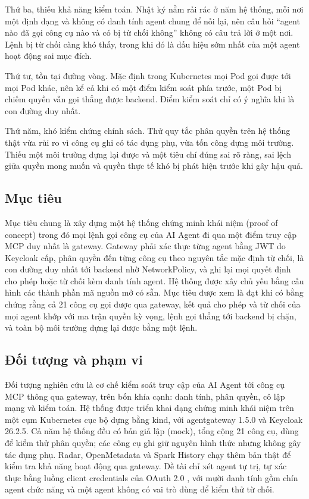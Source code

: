 Thứ ba, thiếu khả năng kiểm toán. Nhật ký nằm rải rác ở năm hệ thống, mỗi nơi một định dạng và không có danh tính agent chung để nối lại, nên câu hỏi ``agent nào đã gọi công cụ nào và có bị từ chối không'' không có câu trả lời ở một nơi. Lệnh bị từ chối càng khó thấy, trong khi đó là dấu hiệu sớm nhất của một agent hoạt động sai mục đích.

Thứ tư, tồn tại đường vòng. Mặc định trong Kubernetes mọi Pod gọi được tới mọi Pod khác, nên kể cả khi có một điểm kiểm soát phía trước, một Pod bị chiếm quyền vẫn gọi thẳng được backend. Điểm kiểm soát chỉ có ý nghĩa khi là con đường duy nhất.

Thứ năm, khó kiểm chứng chính sách. Thử quy tắc phân quyền trên hệ thống thật vừa rủi ro vì công cụ ghi có tác dụng phụ, vừa tốn công dựng môi trường. Thiếu một môi trường dựng lại được và một tiêu chí đúng sai rõ ràng, sai lệch giữa quyền mong muốn và quyền thực tế khó bị phát hiện trước khi gây hậu quả.

\subsection{Mục tiêu}

Mục tiêu chung là xây dựng một hệ thống chứng minh khái niệm (proof of concept) trong đó mọi lệnh gọi công cụ của AI Agent đi qua một điểm truy cập MCP duy nhất là gateway. Gateway phải xác thực từng agent bằng JWT do Keycloak cấp, phân quyền đến từng công cụ theo nguyên tắc mặc định từ chối, là con đường duy nhất tới backend nhờ NetworkPolicy, và ghi lại mọi quyết định cho phép hoặc từ chối kèm danh tính agent. Hệ thống được xây chủ yếu bằng cấu hình các thành phần mã nguồn mở có sẵn. Mục tiêu được xem là đạt khi có bằng chứng rằng cả 21 công cụ gọi được qua gateway, kết quả cho phép và từ chối của mọi agent khớp với ma trận quyền kỳ vọng, lệnh gọi thẳng tới backend bị chặn, và toàn bộ môi trường dựng lại được bằng một lệnh.

\subsection{Đối tượng và phạm vi}

Đối tượng nghiên cứu là cơ chế kiểm soát truy cập của AI Agent tới công cụ MCP thông qua gateway, trên bốn khía cạnh: danh tính, phân quyền, cô lập mạng và kiểm toán. Hệ thống được triển khai dạng chứng minh khái niệm trên một cụm Kubernetes cục bộ dựng bằng kind, với agentgateway 1.5.0 và Keycloak 26.2.5. Cả năm hệ thống đều có bản giả lập (mock), tổng cộng 21 công cụ, dùng để kiểm thử phân quyền; các công cụ ghi giữ nguyên hình thức nhưng không gây tác dụng phụ. Radar, OpenMetadata và Spark History chạy thêm bản thật để kiểm tra khả năng hoạt động qua gateway. Đề tài chỉ xét agent tự trị, tự xác thực bằng luồng client credentials của OAuth 2.0 \parencite{rfc6749}, với mười danh tính gồm chín agent chức năng và một agent không có vai trò dùng để kiểm thử từ chối.

